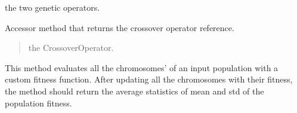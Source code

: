 \documentclass[letterpaper,10pt,english]{sphinxmanual}
\begin{document}
\begin{fulllineitems}
\begin{fulllineitems}
\begin{quote}
\begin{description}
\end{description}\end{quote}

\sphinxAtStartPar
the two genetic operators.

\end{fulllineitems}


\begin{fulllineitems}
\label{\detokenize{pygenalgo.engines:pygenalgo.engines.generic_ga.GenericGA.crossover_op}}
\pysigstartsignatures
{}
\pysigstopsignatures
\sphinxAtStartPar
Accessor method that returns the crossover operator reference.
\begin{quote}\begin{description}
\sphinxAtStartPar
the CrossoverOperator.

\end{description}\end{quote}

\end{fulllineitems}


\begin{fulllineitems}
\label{\detokenize{pygenalgo.engines:pygenalgo.engines.generic_ga.GenericGA.evaluate_fitness}}
\pysigstartsignatures
{}
\pysigstopsignatures
\sphinxAtStartPar
This method evaluates all the chromosomes’ of an input population
with a custom fitness function. After updating all the chromosomes
with their fitness, the method should return the average statistics
of mean and std of the population fitness.

\end{fulllineitems}


\end{fulllineitems}
\end{document}

